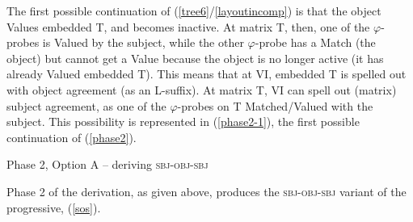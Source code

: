 \documentclass[output=paper
,modfonts
,nonflat]{langsci/langscibook}
\begin{document}
The first possible continuation of (\ref{tree6}/\ref{layoutincomp}) is that the object Values embedded T, and becomes inactive. At matrix T, then, one of the $\varphi$-probes is Valued by the subject, while the other $\varphi$-probe has a Match (the object) but cannot get a Value because the object is no longer active (it has already Valued embedded T). This means that at VI, embedded T is spelled out with object agreement (as an L-suffix). At matrix T, VI can spell out (matrix) subject agreement, as one of the $\varphi$-probes on T Matched/Valued with the subject. This possibility is represented in (\ref{phase2-1}), the first possible continuation of (\ref{phase2}).

\begin{exe}
\ex Phase 2, Option A -- deriving \textsc{sbj-obj-sbj} \label{phase2-1}
\begin{xlist}
\end{xlist}
\end{exe}

\noindent Phase 2 of the derivation, as given above, produces the \textsc{sbj-obj-sbj} variant of the progressive, (\ref{sos}).
\end{document}
